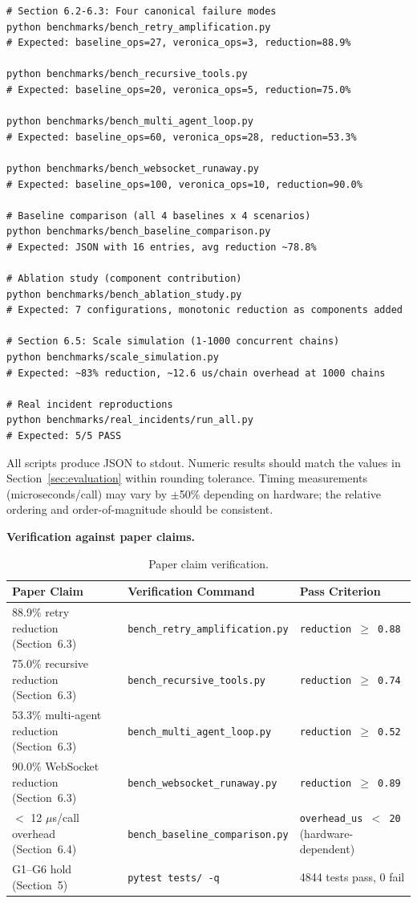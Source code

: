 \documentclass[11pt]{article}
\begin{document}
\begin{lstlisting}[style=bash]
# Section 6.2-6.3: Four canonical failure modes
python benchmarks/bench_retry_amplification.py
# Expected: baseline_ops=27, veronica_ops=3, reduction=88.9%

python benchmarks/bench_recursive_tools.py
# Expected: baseline_ops=20, veronica_ops=5, reduction=75.0%

python benchmarks/bench_multi_agent_loop.py
# Expected: baseline_ops=60, veronica_ops=28, reduction=53.3%

python benchmarks/bench_websocket_runaway.py
# Expected: baseline_ops=100, veronica_ops=10, reduction=90.0%

# Baseline comparison (all 4 baselines x 4 scenarios)
python benchmarks/bench_baseline_comparison.py
# Expected: JSON with 16 entries, avg reduction ~78.8%

# Ablation study (component contribution)
python benchmarks/bench_ablation_study.py
# Expected: 7 configurations, monotonic reduction as components added

# Section 6.5: Scale simulation (1-1000 concurrent chains)
python benchmarks/scale_simulation.py
# Expected: ~83% reduction, ~12.6 us/chain overhead at 1000 chains

# Real incident reproductions
python benchmarks/real_incidents/run_all.py
# Expected: 5/5 PASS
\end{lstlisting}

All scripts produce JSON to stdout. Numeric results should match the values in
Section~\ref{sec:evaluation} within rounding tolerance. Timing measurements
(microseconds/call) may vary by $\pm$50\% depending on hardware; the relative
ordering and order-of-magnitude should be consistent.

\textbf{Verification against paper claims.}

\begin{table}[!ht]
\centering
\footnotesize
\caption{Paper claim verification.}
\label{tab:verification}
\begin{tabular}{@{}p{4cm}p{5cm}p{3.5cm}@{}}
\toprule
\textbf{Paper Claim} & \textbf{Verification Command} &
\textbf{Pass Criterion} \\
\midrule
88.9\% retry reduction (Section~6.3) &
\texttt{bench\_retry\_amplification.py} &
\texttt{reduction $\geq$ 0.88} \\
75.0\% recursive reduction (Section~6.3) &
\texttt{bench\_recursive\_tools.py} &
\texttt{reduction $\geq$ 0.74} \\
53.3\% multi-agent reduction (Section~6.3) &
\texttt{bench\_multi\_agent\_loop.py} &
\texttt{reduction $\geq$ 0.52} \\
90.0\% WebSocket reduction (Section~6.3) &
\texttt{bench\_websocket\_runaway.py} &
\texttt{reduction $\geq$ 0.89} \\
$<$ 12 $\mu$s/call overhead (Section~6.4) &
\texttt{bench\_baseline\_comparison.py} &
\texttt{overhead\_us $<$ 20} (hardware-dependent) \\
G1--G6 hold (Section~5) &
\texttt{pytest tests/ -q} &
4844 tests pass, 0 fail \\
\bottomrule
\end{tabular}
\end{table}
\end{document}
